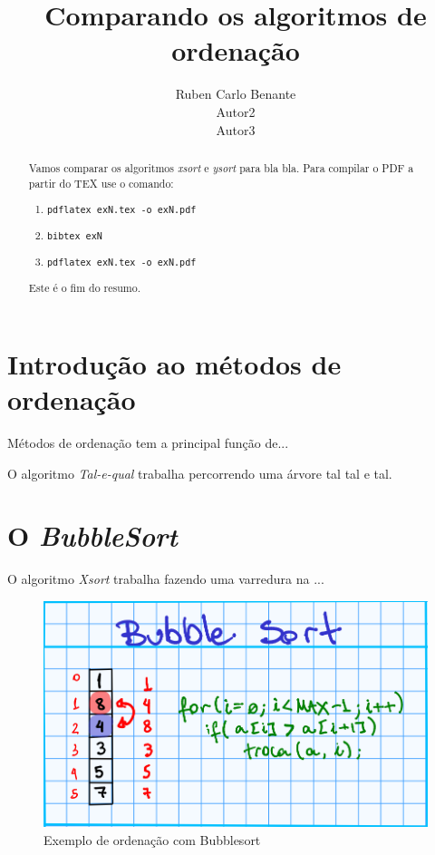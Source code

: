 \documentclass[a4paper,10pt]{article} %
\title{Comparando os algoritmos de ordenação}
\author{Ruben Carlo Benante \\ Autor2 \\ Autor3}
\begin{document}
\maketitle

\begin{abstract}

Vamos comparar os algoritmos \textit{xsort} e \textit{ysort} para bla bla.
Para compilar o PDF a partir do TEX use o comando:

\begin{enumerate}
 \item \texttt{pdflatex exN.tex -o exN.pdf}
 \item \texttt{bibtex exN}
 \item \texttt{pdflatex exN.tex -o exN.pdf}
\end{enumerate}

Este é o fim do resumo.

\end{abstract}


\section{Introdução ao métodos de ordenação}

Métodos de ordenação tem a principal função de...

O algoritmo \textit{Tal-e-qual} trabalha percorrendo uma árvore tal tal e tal.

\section{O \textit{BubbleSort}}

O algoritmo \emph{Xsort} trabalha fazendo uma varredura na ...

\begin{figure}[ht]
\centering
\includegraphics[width=.80\linewidth]{bubble.png}
\caption{Exemplo de ordenação com Bubblesort}
\label{fig:xsort}
\end{figure}
\end{document}

